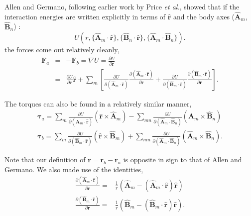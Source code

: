Allen and Germano,\cite{Allen06} following earlier work by Price
{\em et al.},\cite{Price84} showed that if the interaction
energies are written explicitly in terms of $\hat{\mathbf{r}}$ and the body
axes ($\hat{\mathbf{A}}_m$, $\hat{\mathbf{B}}_n$) :
%
\begin{equation}
U(r, \{\hat{\mathbf{A}}_m \cdot \hat{\mathbf{r}} \}, 
\{\hat{\mathbf{B}}_n\cdot \hat{\mathbf{r}} \}, 
\{\hat{\mathbf{A}}_m \cdot \hat{\mathbf{B}}_n \}) .
\label{ugeneral}
\end{equation}
%
the forces come out relatively cleanly,
%
\begin{eqnarray}
\mathbf{F}_a &=&-\mathbf{F}_b =  \nabla U = \frac{\partial U}{\partial \mathbf{r}} \nonumber \\   
&=& \frac{\partial U}{\partial r} \hat{\mathbf{r}} 
 + \sum_m \left[ 
\frac{\partial U}{\partial (\hat{\mathbf{A}}_m \cdot \hat{\mathbf{r}})} 
\frac { \partial (\hat{\mathbf{A}}_m \cdot \hat{\mathbf{r}})}{\partial \mathbf{r}} 
+ \frac{\partial U}{\partial (\hat{\mathbf{B}}_m \cdot \hat{\mathbf{r}})} 
\frac { \partial (\hat{\mathbf{B}}_m \cdot \hat{\mathbf{r}})}{\partial \mathbf{r}} 
\right] \label{forceequation}.
\end{eqnarray}

The torques can also be found in a relatively similar
manner,
%
\begin{eqnarray}
\mathbf{\tau}_a =
 \sum_m 
\frac{\partial U}{\partial (\hat{\mathbf{A}}_m \cdot \hat{\mathbf{r}})} 
( \hat{\mathbf{r}} \times \hat{\mathbf{A}}_m )
-\sum_{mn}
\frac{\partial U}{\partial (\hat{\mathbf{A}}_m \cdot \hat{\mathbf{B}}_n)} 
(\hat{\mathbf{A}}_m \times \hat{\mathbf{B}}_n) \\
%
\mathbf{\tau}_b =
 \sum_m 
\frac{\partial U}{\partial (\hat{\mathbf{B}}_m \cdot \hat{\mathbf{r}})} 
( \hat{\mathbf{r}} \times \hat{\mathbf{B}}_m)
+\sum_{mn}
\frac{\partial U}{\partial (\hat{\mathbf{A}}_m \cdot \hat{\mathbf{B}}_n)} 
(\hat{\mathbf{A}}_m \times \hat{\mathbf{B}}_n) .
\end{eqnarray}

Note that our definition of $\mathbf{r}=\mathbf{r}_b - \mathbf{r}_a $
is opposite in sign to that of Allen and Germano.\cite{Allen06}
We also made use of the identities,
%
\begin{align}
\frac { \partial (\hat{\mathbf{A}}_m \cdot \hat{\mathbf{r}})}{\partial \mathbf{r}} 
=& \frac{1}{r} \left(  \hat{\mathbf{A}}_m - (\hat{\mathbf{A}}_m \cdot \hat{\mathbf{r}})\hat{\mathbf{r}}
\right) \\
\frac { \partial (\hat{\mathbf{B}}_m \cdot \hat{\mathbf{r}})}{\partial \mathbf{r}} 
=& \frac{1}{r} \left(  \hat{\mathbf{B}}_m - (\hat{\mathbf{B}}_m \cdot \hat{\mathbf{r}})\hat{\mathbf{r}} 
\right).
\end{align}

